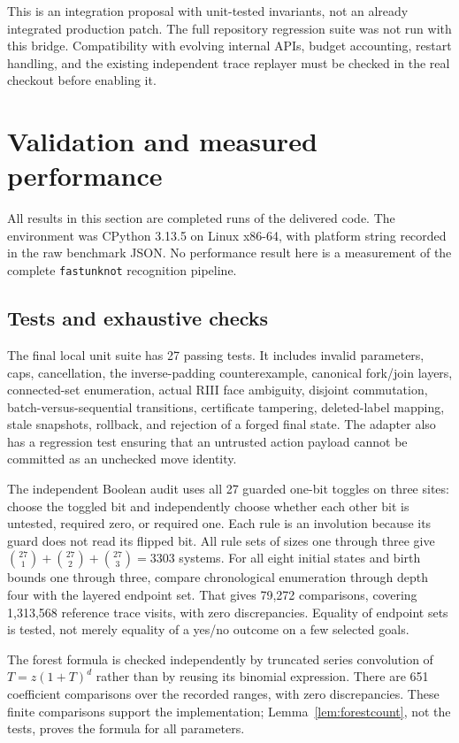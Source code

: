 \documentclass[11pt]{article}
\theoremstyle{definition}
\newcommand{\code}[1]{\texttt{#1}}
\begin{document}
This is an integration proposal with unit-tested invariants, not an
already integrated production patch. The full repository regression
suite was not run with this bridge. Compatibility with evolving internal
APIs, budget accounting, restart handling, and the existing independent
trace replayer must be checked in the real checkout before enabling it.

\section{Validation and measured performance}
\label{sec:experiments}

All results in this section are completed runs of the delivered code.
The environment was CPython 3.13.5 on Linux x86-64, with platform string
recorded in the raw benchmark JSON. No performance result here is a
measurement of the complete \code{fastunknot} recognition pipeline.

\subsection{Tests and exhaustive checks}

The final local unit suite has 27 passing tests. It includes invalid
parameters, caps, cancellation, the inverse-padding counterexample,
canonical fork/join layers, connected-set enumeration, actual RIII face
ambiguity, disjoint commutation, batch-versus-sequential transitions,
certificate tampering, deleted-label mapping, stale snapshots, rollback,
and rejection of a forged final state. The adapter also has a regression
test ensuring that an untrusted action payload cannot be committed as
an unchecked move identity.

The independent Boolean audit uses all 27 guarded one-bit toggles on
three sites: choose the toggled bit and independently choose whether each
other bit is untested, required zero, or required one. Each rule is an
involution because its guard does not read its flipped bit. All rule sets
of sizes one through three give
$\binom{27}{1}+\binom{27}{2}+\binom{27}{3}=3303$ systems. For all eight
initial states and birth bounds one through three, compare chronological
enumeration through depth four with the layered endpoint set. That gives
79,272 comparisons, covering 1,313,568 reference trace visits, with zero
discrepancies. Equality of endpoint sets is tested, not merely equality
of a yes/no outcome on a few selected goals.

The forest formula is checked independently by truncated series
convolution of $T=z(1+T)^d$ rather than by reusing its binomial expression.
There are 651 coefficient comparisons over the recorded ranges, with
zero discrepancies. These finite comparisons support the implementation;
Lemma~\ref{lem:forestcount}, not the tests, proves the formula for all
parameters.
\end{document}
